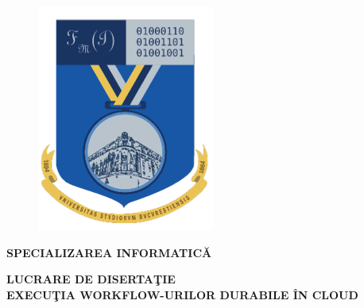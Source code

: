 \documentclass[a4paper,12pt]{report}
\begin{document}
\begin{titlepage}
\begin{center}
\begin{figure}[htbp]
            \begin{minipage}{0.2\textwidth}
              \includegraphics[width=\linewidth]{images/poza_dreapta.png}
            \end{minipage}
        \end{figure}
        
        \vspace*{1cm}
        
        \begin{large}
            \textbf{SPECIALIZAREA INFORMATICĂ}
        \end{large}

        \vspace{2.5cm}
        \begin{LARGE}
            \textbf{LUCRARE DE DISERTAŢIE}\\
            \vspace*{0.5cm}
            \textbf{EXECUŢIA WORKFLOW-URILOR DURABILE ÎN CLOUD}
        \end{LARGE}
            

\end{center}
\end{titlepage}
\end{document}
